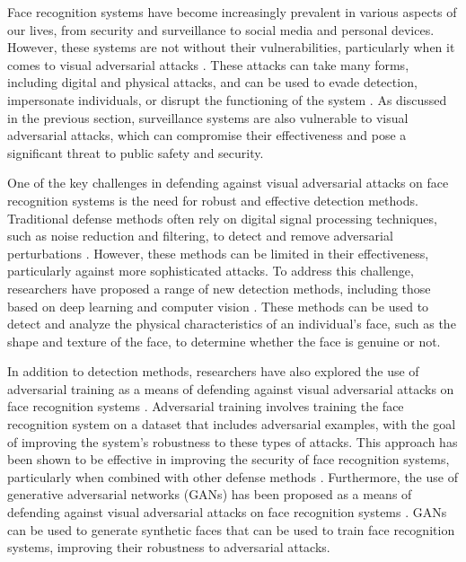 \documentclass[11pt]{article}
\begin{document}
Face recognition systems have become increasingly prevalent in various aspects of our lives, from security and surveillance to social media and personal devices. However, these systems are not without their vulnerabilities, particularly when it comes to visual adversarial attacks \cite{ref199}. These attacks can take many forms, including digital and physical attacks, and can be used to evade detection, impersonate individuals, or disrupt the functioning of the system \cite{ref200}. As discussed in the previous section, surveillance systems are also vulnerable to visual adversarial attacks, which can compromise their effectiveness and pose a significant threat to public safety and security.

One of the key challenges in defending against visual adversarial attacks on face recognition systems is the need for robust and effective detection methods. Traditional defense methods often rely on digital signal processing techniques, such as noise reduction and filtering, to detect and remove adversarial perturbations \cite{ref201}. However, these methods can be limited in their effectiveness, particularly against more sophisticated attacks. To address this challenge, researchers have proposed a range of new detection methods, including those based on deep learning \cite{ref202} and computer vision \cite{ref203}. These methods can be used to detect and analyze the physical characteristics of an individual's face, such as the shape and texture of the face, to determine whether the face is genuine or not.

In addition to detection methods, researchers have also explored the use of adversarial training as a means of defending against visual adversarial attacks on face recognition systems \cite{ref204}. Adversarial training involves training the face recognition system on a dataset that includes adversarial examples, with the goal of improving the system's robustness to these types of attacks. This approach has been shown to be effective in improving the security of face recognition systems, particularly when combined with other defense methods \cite{ref205}. Furthermore, the use of generative adversarial networks (GANs) has been proposed as a means of defending against visual adversarial attacks on face recognition systems \cite{ref206}. GANs can be used to generate synthetic faces that can be used to train face recognition systems, improving their robustness to adversarial attacks.
\end{document}
